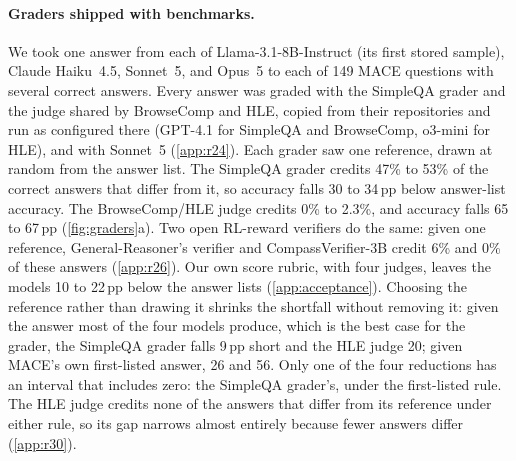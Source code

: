 \documentclass{article}
\begin{document}
\paragraph{Graders shipped with benchmarks.}
We took one answer from each of Llama-3.1-8B-Instruct (its first stored sample), Claude Haiku~4.5, Sonnet~5, and Opus~5 to each of 149 \textsc{MACE} questions with several correct answers.
Every answer was graded with the SimpleQA grader and the judge shared by BrowseComp and HLE, copied from their repositories and run as configured there (GPT-4.1 for SimpleQA and BrowseComp, o3-mini for HLE), and with Sonnet~5 (\cref{app:r24}).
Each grader saw one reference, drawn at random from the answer list.
The SimpleQA grader credits 47\% to 53\% of the correct answers that differ from it, so accuracy falls 30 to 34\,pp below answer-list accuracy. The BrowseComp/HLE judge credits 0\% to 2.3\%, and accuracy falls 65 to 67\,pp (\cref{fig:graders}a).
Two open RL-reward verifiers do the same: given one reference, General-Reasoner's verifier and CompassVerifier-3B credit 6\% and 0\% of these answers (\cref{app:r26}).
Our own score rubric, with four judges, leaves the models 10 to 22\,pp below the answer lists (\cref{app:acceptance}).
Choosing the reference rather than drawing it shrinks the shortfall without removing it: given the answer most of the four models produce, which is the best case for the grader, the SimpleQA grader falls 9\,pp short and the HLE judge 20; given \textsc{MACE}'s own first-listed answer, 26 and 56. Only one of the four reductions has an interval that includes zero: the SimpleQA grader's, under the first-listed rule. The HLE judge credits none of the answers that differ from its reference under either rule, so its gap narrows almost entirely because fewer answers differ (\cref{app:r30}).
\end{document}

